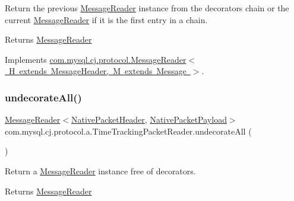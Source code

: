 Return the previous \mbox{\hyperlink{interfacecom_1_1mysql_1_1cj_1_1protocol_1_1_message_reader}{Message\+Reader}} instance from the decorators chain or the current \mbox{\hyperlink{interfacecom_1_1mysql_1_1cj_1_1protocol_1_1_message_reader}{Message\+Reader}} if it is the first entry in a chain.

\begin{DoxyReturn}{Returns}
\mbox{\hyperlink{interfacecom_1_1mysql_1_1cj_1_1protocol_1_1_message_reader}{Message\+Reader}} 
\end{DoxyReturn}


Implements \mbox{\hyperlink{interfacecom_1_1mysql_1_1cj_1_1protocol_1_1_message_reader_a59b0e118857c167ad4a270845f19e89b}{com.\+mysql.\+cj.\+protocol.\+Message\+Reader$<$ H extends Message\+Header, M extends Message $>$}}.

\mbox{\label{classcom_1_1mysql_1_1cj_1_1protocol_1_1a_1_1_time_tracking_packet_reader_ab320fc6184aad94ebdba7260b574421f}} 
\subsubsection{\texorpdfstring{undecorate\+All()}{undecorateAll()}}
{\footnotesize\ttfamily \mbox{\hyperlink{interfacecom_1_1mysql_1_1cj_1_1protocol_1_1_message_reader}{Message\+Reader}}$<$\mbox{\hyperlink{classcom_1_1mysql_1_1cj_1_1protocol_1_1a_1_1_native_packet_header}{Native\+Packet\+Header}}, \mbox{\hyperlink{classcom_1_1mysql_1_1cj_1_1protocol_1_1a_1_1_native_packet_payload}{Native\+Packet\+Payload}}$>$ com.\+mysql.\+cj.\+protocol.\+a.\+Time\+Tracking\+Packet\+Reader.\+undecorate\+All (\begin{DoxyParamCaption}{ }\end{DoxyParamCaption})}

Return a \mbox{\hyperlink{interfacecom_1_1mysql_1_1cj_1_1protocol_1_1_message_reader}{Message\+Reader}} instance free of decorators.

\begin{DoxyReturn}{Returns}
\mbox{\hyperlink{interfacecom_1_1mysql_1_1cj_1_1protocol_1_1_message_reader}{Message\+Reader}} 
\end{DoxyReturn}


